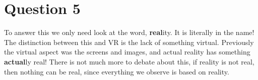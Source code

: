 \documentclass[12pt]{article}
\begin{document}
\section*{Question 5}
To answer this we only need look at the word, \textbf{real}ity. It is literally in the name! The distinction between this and VR is the lack of something virtual. Previously the virtual aspect was the screens and images, and actual reality has something \textbf{actual}ly real! There is not much more to debate about this, if reality is not real, then nothing can be real, since everything we observe is based on reality. 
\end{document}
